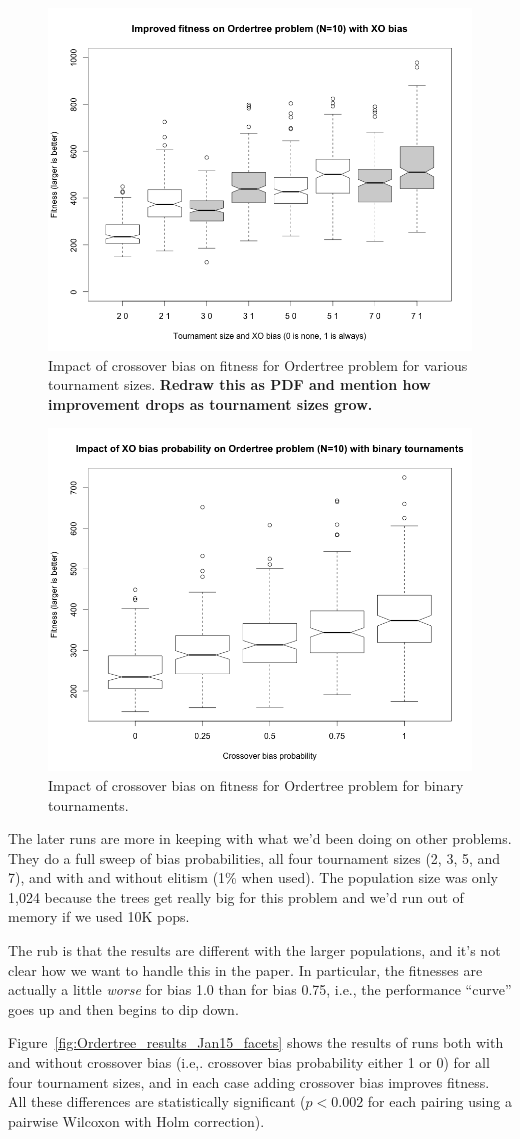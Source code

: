 \documentclass{sig-alternate}
\begin{document}
\begin{figure}
\centering
\includegraphics[width=0.45 \textwidth]{Plots/Ordertree_results.png}
\caption{Impact of crossover bias on fitness for Ordertree problem for various tournament sizes. \textbf{Redraw this 
as PDF and mention how improvement drops as tournament sizes grow.}}
\label{fig:Ordertree_results}
\end{figure}

\begin{figure}
\centering
\includegraphics[width=0.45 \textwidth]{Plots/Ordertree_XO_bias_prob_binary_tournaments.png}
\caption{Impact of crossover bias on fitness for Ordertree problem for binary tournaments.}
\label{fig:Ordertree_results_binary_tournaments}
\end{figure}

The later runs are more in keeping with what we'd been doing on other problems. They do a full sweep of bias 
probabilities, all four tournament sizes (2, 3, 5, and 7), and with and without elitism (1\% when used). The population 
size was only 1,024 because the trees get really big for this problem and we'd run out of memory if we used 10K 
pops.

The rub is that the results are different with the larger populations, and it's not clear how we want to handle this in the 
paper. In particular, the fitnesses are actually a little \emph{worse} for bias 1.0 than for bias 0.75, i.e., the performance 
``curve'' goes up and then begins to dip down.

Figure~\ref{fig:Ordertree_results_Jan15_facets} shows the results of runs both with and without crossover bias (i.e,. 
crossover bias probability either 1 or 0) for all four tournament sizes, and in each case adding crossover bias 
improves fitness. All these differences are statistically significant ($p < 0.002$ for each pairing using a pairwise 
Wilcoxon with Holm correction).
\end{document}
